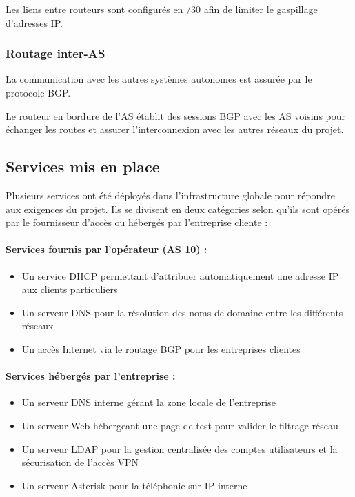 Les liens entre routeurs sont configurés en /30 afin de limiter le gaspillage d'adresses IP.

\subsubsection{Routage inter-AS}

La communication avec les autres systèmes autonomes est assurée par le protocole BGP.

Le routeur en bordure de l'AS établit des sessions BGP avec les AS voisins pour échanger les routes et assurer l'interconnexion avec les autres réseaux du projet.

\subsection{Services mis en place}

Plusieurs services ont été déployés dans l'infrastructure globale pour répondre aux exigences du projet. Ils se divisent en deux catégories selon qu'ils sont opérés par le fournisseur d'accès ou hébergés par l'entreprise cliente :

\paragraph{Services fournis par l'opérateur (AS 10) :}
\begin{itemize}
    \item Un service DHCP permettant d'attribuer automatiquement une adresse IP aux clients particuliers
    \item Un serveur DNS pour la résolution des noms de domaine entre les différents réseaux
    \item Un accès Internet via le routage BGP pour les entreprises clientes
\end{itemize}

\vspace{0.5cm}

\paragraph{Services hébergés par l'entreprise :}
\begin{itemize}
    \item Un serveur DNS interne gérant la zone locale de l'entreprise
    \item Un serveur Web hébergeant une page de test pour valider le filtrage réseau
    \item Un serveur LDAP pour la gestion centralisée des comptes utilisateurs et la sécurisation de l'accès VPN
    \item Un serveur Asterisk pour la téléphonie sur IP interne
\end{itemize}
